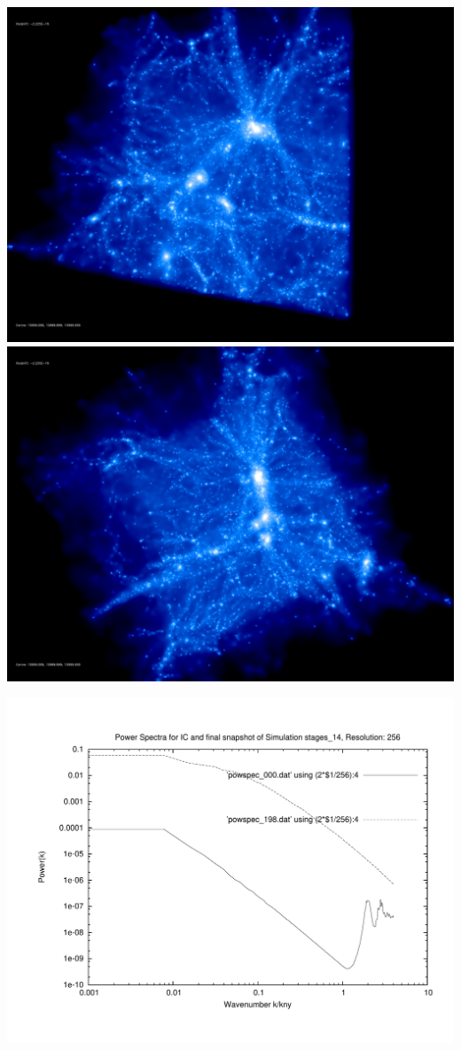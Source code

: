\includegraphics[scale=0.1]{r256/stages_14/rotate_00074.jpg} 
\includegraphics[scale=0.1]{r256/stages_14/rotate_00131.jpg}

\includegraphics[scale=0.5]{r256/stages_14/plot_powspec_stages_14}

